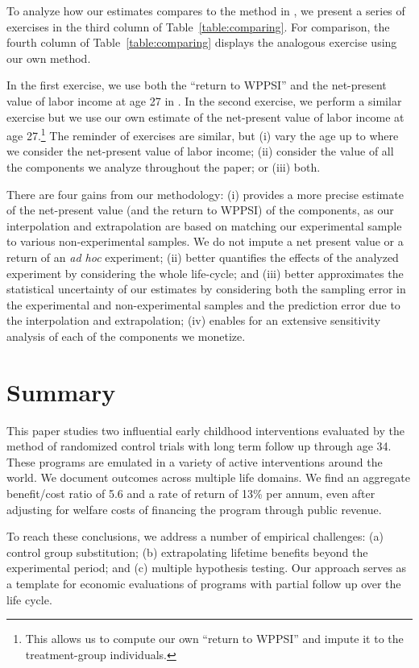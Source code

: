 To analyze how our estimates compares to the method in \citet{Kline_Walters_2016_QJE}, we present a series of exercises in the third column of Table~\ref{table:comparing}. For comparison, the fourth column of Table~\ref{table:comparing} displays the analogous exercise using our own method.

In the first exercise, we use both the ``return to WPPSI'' and the net-present value of labor income at age 27 in  \citet{Chetty_Friedman_etal_2011_QJoE}. In the second exercise, we perform a similar exercise but we use our own estimate of the net-present value of labor income at age 27.\footnote{This allows us to compute our own ``return to WPPSI'' and impute it to the treatment-group individuals.} The reminder of exercises are similar, but (i) vary the age up to where we consider the net-present value of labor income; (ii) consider the value of all the components we analyze throughout the paper; or (iii) both.

There are four gains from our methodology: (i) provides a more precise estimate of the net-present value (and the return to WPPSI) of the components, as our interpolation and extrapolation are based on matching our experimental sample to various non-experimental samples. We do not impute a net present value or a return of an \textit{ad hoc} experiment; (ii) better quantifies the effects of the analyzed experiment by considering the whole life-cycle; and (iii) better approximates the statistical uncertainty of our estimates by considering both the sampling error in the experimental and non-experimental samples and the prediction error due to the interpolation and extrapolation; (iv) enables for an extensive sensitivity analysis of each of the components we monetize.

\section{Summary} \label{section:conclusion}

This paper studies two influential early childhood interventions evaluated by the method of randomized control trials with long term follow up through age 34. These programs are emulated in a variety of active interventions around the world. We document outcomes across multiple life domains. We find an aggregate benefit/cost ratio of 5.6 and a rate of return of 13\% per annum, even after adjusting for welfare costs of financing the program through public revenue.

To reach these conclusions, we address a number of empirical challenges: (a) control group substitution; (b) extrapolating lifetime benefits beyond the experimental period; and (c) multiple hypothesis testing. Our approach serves as a template for economic evaluations of programs with partial follow up over the life cycle.

